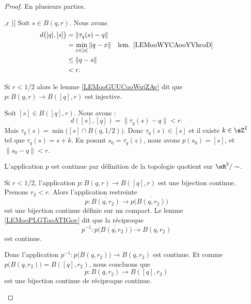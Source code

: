 \begin{proof}
	En plusieurs parties.
	\begin{subproof}
		\spitem[\( p\big( q,r \big)\subset B\big( [q],r \big)\)]
		Soit \( s\in B(q,r)\). Nous avons
		\begin{subequations}
			\begin{align}
				d\big( [q],[s] \big) & =\| \tau_q(s)-q \|                                             \\
				                     & =\min_{x\in[s]}\| q-x \| & \text{lem. \ref{LEMooWYCAooYVhcoD}} \\
				                     & \leq \| q-s \|                                                 \\
				                     & <r.
			\end{align}
		\end{subequations}

		\spitem[Injective]
		Si \( r<1/2\) alors le lemme \ref{LEMooGUUCooWujZAv} dit que \(p \colon B(q,r)\to  B([q],r) \) est injective.

		\spitem[Surjective]
		Soit \( [s]\in B([q], r)\). Nous avons :
		\begin{equation}
			d([s],[q])=\| \tau_q(s)-q \|<r.
		\end{equation}
		Mais \( \tau_q(s)=\min\big( [s]\cap \overline{B(q,1/2)} \big)\).  Donc \( \tau_q(s)\in [s]\) et il existe \( k\in \eZ^2\) tel que \( \tau_q(s)=s+k\). En posant \(s_0= \tau_q(z)\), nous avons \( p(s_0)=[s]\), et \( \| s_0-q \|<r\).

		\spitem[Continue]
		L'application \( p\) est continue par définition de la topologie quotient sur \( \eR^2/\sim\).

		Si \( r<1/2\), l'application \(p \colon B(q,r)\to B([q],r)  \) est une bijection continue. Prenons \( r_2<r\). Alors l'application restreinte
		\begin{equation}
			p \colon \overline{B(q,r_2)}\to p\big( \overline{B(q,r_2)} \big)
		\end{equation}
		est une bijection continue définie sur un compact. Le lemme \ref{LEMooPLGTooATIGov} dit que la réciproque
		\begin{equation}
			p^{-1} \colon p\big( \overline{B(q,r_2)} \big)\to \overline{B(q,r_2)}
		\end{equation}
		est continue.

		Donc l'application \(p^{-1} \colon     p\big( B(q,r_2) \big)   \to B(q,r_2)  \) est continue. Et comme \( p\big( B(q,r_2) \big)=B([q],r_2)\), nous concluons que
		\begin{equation}
			p \colon B(q,r_2)\to B([q],r_2)
		\end{equation}
		est une bijection continue de réciproque continue.
	\end{subproof}
\end{proof}

